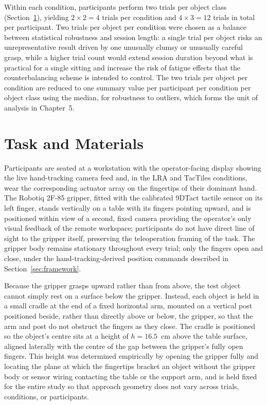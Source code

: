 \documentclass[12pt, a4paper]{report}
\begin{document}
Within each condition, participants perform two trials per object class (Section~\ref{sec:task}), yielding $2 \times 2 = 4$ trials per condition and $4 \times 3 = 12$ trials in total per participant. Two trials per object per condition were chosen as a balance between statistical robustness and session length: a single trial per object risks an unrepresentative result driven by one unusually clumsy or unusually careful grasp, while a higher trial count would extend session duration beyond what is practical for a single sitting and increase the risk of fatigue effects that the counterbalancing scheme is intended to control. The two trials per object per condition are reduced to one summary value per participant per condition per object class using the median, for robustness to outliers, which forms the unit of analysis in Chapter~5.

\section{Task and Materials}
\label{sec:task}
Participants are seated at a workstation with the operator-facing display showing the live hand-tracking camera feed and, in the LRA and TacTiles conditions, wear the corresponding actuator array on the fingertips of their dominant hand. The Robotiq 2F-85 gripper, fitted with the calibrated 9DTact tactile sensor on its left finger, stands vertically on a table with its fingers pointing upward, and is positioned within view of a second, fixed camera providing the operator's only visual feedback of the remote workspace; participants do not have direct line of sight to the gripper itself, preserving the teleoperation framing of the task. The gripper body remains stationary throughout every trial; only the fingers open and close, under the hand-tracking-derived position commands described in Section~\ref{sec:framework}.

Because the gripper grasps upward rather than from above, the test object cannot simply rest on a surface below the gripper. Instead, each object is held in a small cradle at the end of a fixed horizontal arm, mounted on a vertical post positioned beside, rather than directly above or below, the gripper, so that the arm and post do not obstruct the fingers as they close. The cradle is positioned so the object's centre sits at a height of $h = 16.5$~cm above the table surface, aligned laterally with the centre of the gap between the gripper's fully open fingers. This height was determined empirically by opening the gripper fully and locating the plane at which the fingertips bracket an object without the gripper body or sensor wiring contacting the table or the support arm, and is held fixed for the entire study so that approach geometry does not vary across trials, conditions, or participants.
\end{document}
